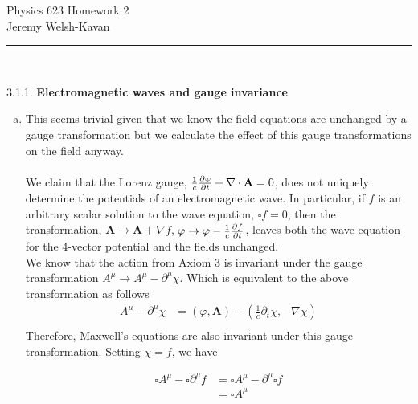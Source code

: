 \documentclass[]{article}
\begin{document}
{\Large Physics 623 Homework 2}\\
{Jeremy Welsh-Kavan}\\
\vspace{0.2 cm}
\begin{center}
\noindent\rule{15cm}{0.4pt} \\
\end{center}

3.1.1. {\bf Electromagnetic waves and gauge invariance}

\begin{enumerate}[a)]

\item This seems trivial given that we know the field equations are unchanged by a gauge transformation but we calculate the effect of this gauge transformations on the field anyway. \\
\hfill \\
We claim that the Lorenz gauge, $\frac{1}{c} \pdv{\varphi}{t} + \nabla\cdot\textbf{A} = 0$, does not uniquely determine the potentials of an electromagnetic wave. In particular, if $f$ is an arbitrary scalar solution to the wave equation, $\square f = 0$, then the transformation, $\textbf{A}\to \textbf{A} + \nabla f$, $\varphi\to \varphi - \frac{1}{c}\pdv{f}{t}$, leaves both the wave equation for the 4-vector potential and the fields unchanged. \\
We know that the action from Axiom 3 is invariant under the gauge transformation $A^\mu\to A^\mu - \partial^\mu\chi$. Which is equivalent to the above transformation as follows
\begin{equation}
\begin{split}
A^\mu - \partial^\mu \chi & =  (\varphi,\textbf{A}) - (\frac{1}{c}\partial_t \chi, - \nabla \chi) \\
\end{split}
\end{equation}
Therefore, Maxwell's equations are also invariant under this gauge transformation. Setting $\chi = f$, we have 

\begin{equation}
\begin{split}
\square A^\mu - \square\partial^\mu f & =  \square A^\mu - \partial^\mu \square f \\
& = \square A^\mu \\
\end{split}
\end{equation}


\end{enumerate}
\end{document}
